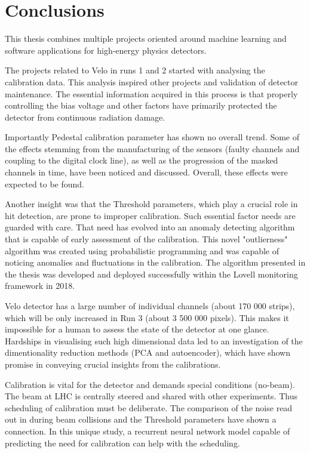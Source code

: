 \chapter{Conclusions}


This thesis combines multiple projects oriented around machine learning and software applications for high-energy physics detectors.

The projects related to Velo in runs 1 and 2 started with analysing the calibration data. This analysis inspired other projects and validation of detector maintenance.
The essential information acquired in this process is that properly controlling the bias voltage and other factors have primarily protected the detector from continuous radiation damage. 

Importantly Pedestal calibration parameter has shown no overall trend.
Some of the effects stemming from the manufacturing of the sensors (faulty channels and coupling to the digital clock line), as well as the progression of the masked channels in time, have been noticed and discussed. Overall, these effects were expected to be found.

Another insight was that the Threshold parameters, which play a crucial role in hit detection, are prone to improper calibration. 
Such essential factor needs are guarded with care. 
That need has evolved into an anomaly detecting algorithm that is capable of early assessment of the calibration. 
This novel "outlierness" algorithm was created using probabilistic programming and was capable of noticing anomalies and fluctuations in the calibration. The algorithm presented in the thesis was developed and deployed successfully within the Lovell monitoring framework in 2018.

Velo detector has a large number of individual channels (about 170 000 strips), which will be only increased in Run 3 (about 3 500 000 pixels).
This makes it impossible for a human to assess the state of the detector at one glance. Hardships in visualising such high dimensional data led to an investigation of the dimentionality reduction methods (PCA and autoencoder), which have shown promise in conveying crucial insights from the calibrations.

Calibration is vital for the detector and demands special conditions (no-beam).
The beam at LHC is centrally steered and shared with other experiments. 
Thus scheduling of calibration must be deliberate.
The comparison of the noise read out in during beam collisions and the Threshold parameters have shown a connection. 
In this unique study, a recurrent neural network model capable of predicting the need for calibration can help with the scheduling.



